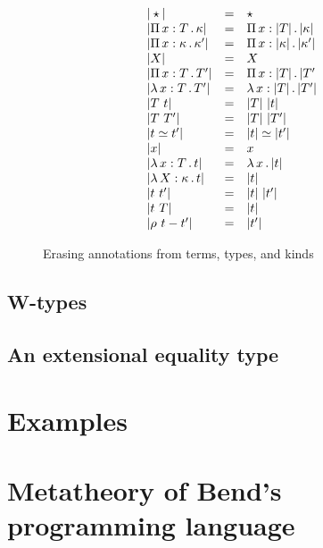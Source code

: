 \documentclass{article}
\begin{document}
\begin{figure}
  \[
  \begin{array}{lll}
    |\star| & = & \star \\
    |\Pi\, x: T\, .\, \kappa| & = & \Pi\, x: |T|\, .\, |\kappa| \\
    |\Pi\, x: \kappa\, .\, \kappa'| & = & \Pi\, x: |\kappa|\, .\, |\kappa'| \\
    |X| & = & X \\
    |\Pi\, x: T\, .\, T'| & = & \Pi\, x: |T|\, .\, |T' \\
    |\lambda\, x : T\, .\, T'| & = & \lambda\, x : |T|\, .\, |T'| \\
    |T\ t| & = & |T|\ |t| \\
    |T\ T'| & = & |T|\ |T'| \\
    |t \simeq t'| & = & |t| \simeq |t'| \\
    |x| & = & x \\
    |\lambda\, x : T\, .\, t| & = & \lambda\, x\, .\, |t| \\
    |\lambda\, X : \kappa\, .\, t| & = & |t| \\
    |t\ t'| & = & |t|\ |t'| \\
    |t\ T| & = & |t| \\
    |\rho\ t - t'| & = & |t'|
  \end{array}
  \]
  \caption{Erasing annotations from terms, types, and kinds}
  \label{fig:erase}
\end{figure}


\subsection{W-types}


\subsection{An extensional equality type}




\section{Examples}



\section{Metatheory of Bend's programming language}
\label{sec:opmeta}



\end{document}
